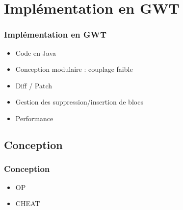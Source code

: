 \section{Implémentation en GWT}
  \begin{frame}
    \frametitle{Implémentation en GWT}
    \begin{itemize}
      \item<1-> Code en Java
      \item<2-> Conception modulaire : couplage faible
      \item<3-> Diff / Patch
      \item<4-> Gestion des suppression/insertion de blocs
      \item<5-> Performance
    \end{itemize}
  \end{frame}

  \subsection*{Conception}
    \begin{frame}
      \frametitle{Conception}
      \begin{itemize}
        \item OP
	\item CHEAT
      \end{itemize}
    \end{frame}


